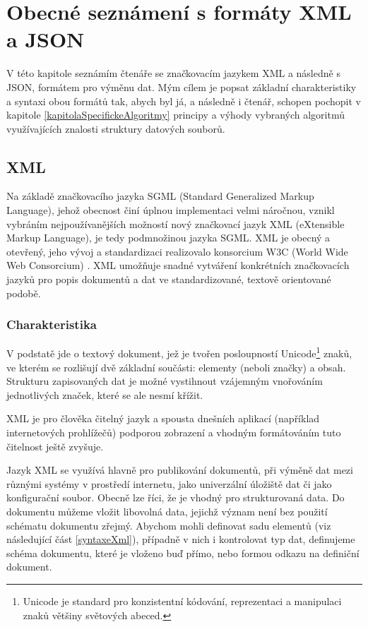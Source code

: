\chapter{Obecné seznámení s formáty XML a JSON}
V této kapitole seznámím čtenáře se značkovacím jazykem XML a následně s JSON, formátem pro výměnu dat. Mým cílem je popsat základní charakteristiky a syntaxi obou formátů tak, abych byl já, a následně i čtenář, schopen pochopit v kapitole \ref{kapitolaSpecifickeAlgoritmy} principy a výhody vybraných algoritmů využívajících znalosti struktury datových souborů.

\section{XML}
Na základě značkovacího jazyka SGML (Standard Generalized Markup Language), jehož obecnost činí úplnou implementaci velmi náročnou, vznikl vybráním nejpoužívanějších možností nový značkovací jazyk XML (eXtensible Markup Language), je tedy podmnožinou jazyka SGML. XML je obecný a otevřený, jeho vývoj a standardizaci realizovalo konsorcium W3C (World Wide Web Consorcium) \cite{w3cxml}. XML umožňuje snadné vytváření konkrétních značkovacích jazyků pro popis dokumentů a dat ve standardizované, textově orientované podobě.

\subsection{Charakteristika}
V podstatě jde o textový dokument, jež je tvořen posloupností Unicode\footnote{Unicode je standard pro konzistentní kódování, reprezentaci a manipulaci znaků většiny světových abeced.} znaků, ve kterém se rozlišují dvě základní součásti: elementy (neboli značky) a obsah. Strukturu zapisovaných dat je možné vystihnout vzájemným vnořováním jednotlivých značek, které se ale nesmí křížit.

XML je pro člověka čitelný jazyk a spousta dnešních aplikací (například internetových prohlížečů) podporou zobrazení a vhodným formátováním tuto čitelnost ještě zvyšuje.

Jazyk XML se využívá hlavně pro publikování dokumentů, při výměně dat mezi různými systémy v prostředí internetu, jako univerzální úložiště dat či jako konfigurační soubor. Obecně lze říci, že je vhodný pro strukturovaná data. Do dokumentu můžeme vložit libovolná data, jejichž význam není bez použití schématu dokumentu zřejmý. Abychom mohli definovat sadu elementů (viz následující část \ref{syntaxeXml}), případně v nich i kontrolovat typ dat, definujeme schéma dokumentu, které je vloženo buď přímo, nebo formou odkazu na definiční dokument.

